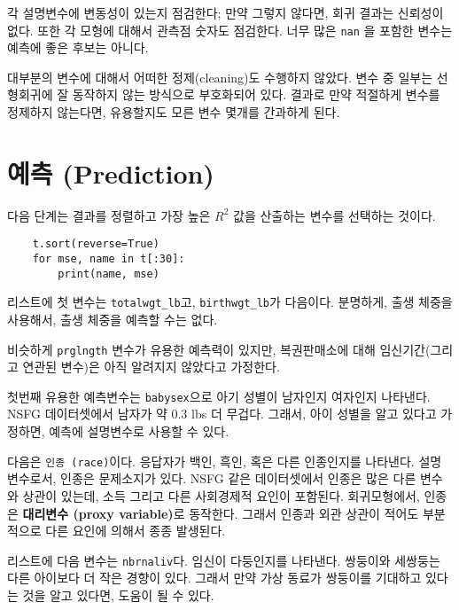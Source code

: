 각 설명변수에 변동성이 있는지 점검한다; 만약 그렇지 않다면, 회귀 결과는 신뢰성이 없다. 또한 각 모형에 대해서 관측점 숫자도 점검한다.
너무 많은 {\tt nan} 을 포함한 변수는 예측에 좋은 후보는 아니다.

대부분의 변수에 대해서 어떠한 정제(cleaning)도 수행하지 않았다.
변수 중 일부는 선형회귀에 잘 동작하지 않는 방식으로 부호화되어 있다.
결과로 만약 적절하게 변수를 정제하지 않는다면, 유용할지도 모른 변수 몇개를 간과하게 된다.


\section{예측 (Prediction)}

다음 단계는 결과를 정렬하고 가장 높은 $R^2$ 값을 산출하는 변수를 선택하는 것이다.

\begin{verbatim}
    t.sort(reverse=True)
    for mse, name in t[:30]:
        print(name, mse)
\end{verbatim}

리스트에 첫 변수는 \verb"totalwgt_lb"고, \verb"birthwgt_lb"가 다음이다. 
분명하게, 출생 체중을 사용해서, 출생 체중을 예측할 수는 없다.

비슷하게 {\tt prglngth} 변수가 유용한 예측력이 있지만, 복권판매소에 대해 임신기간(그리고 연관된 변수)은 아직 알려지지 않았다고 가정한다.

첫번째 유용한 예측변수는 {\tt babysex}으로 아기 성별이 남자인지 여자인지 나타낸다. NSFG 데이터셋에서 남자가 약 0.3 lbs 더 무겁다. 
그래서, 아이 성별을 알고 있다고 가정하면, 예측에 설명변수로 사용할 수 있다.

다음은 {\tt 인종 (race)}이다. 응답자가 백인, 흑인, 혹은 다른 인종인지를 나타낸다. 설명 변수로서, 인종은 문제소지가 있다. NSFG 같은 데이터셋에서 인종은 많은 다른 변수와 상관이 있는데, 소득 그리고 다른 사회경제적 요인이 포함된다. 회귀모형에서, 인종은 {\bf 대리변수 (proxy variable)}로 동작한다. 그래서 인종과 외관 상관이 적어도 부분적으로 다른 요인에 의해서 종종 발생된다.

리스트에 다음 변수는 {\tt nbrnaliv}다. 임신이 다둥인지를 나타낸다.
쌍둥이와 세쌍둥는 다른 아이보다 더 작은 경향이 있다. 그래서 만약 가상 동료가 쌍둥이를 기대하고 있다는 것을 알고 있다면, 도움이 될 수 있다.

